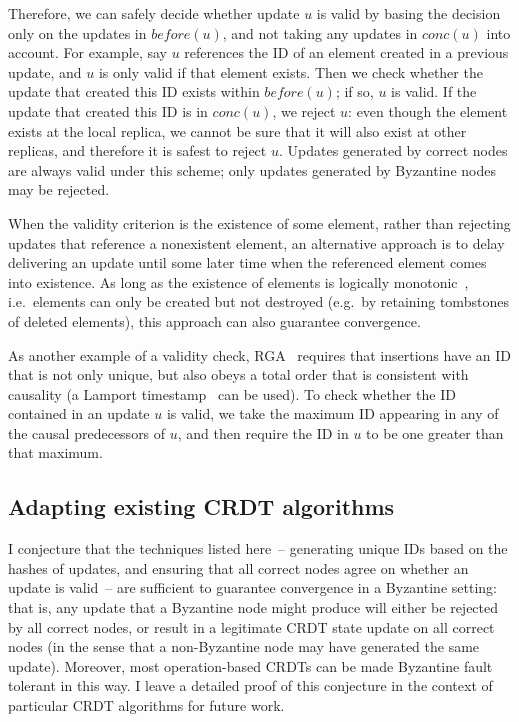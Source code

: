 \documentclass[sigplan,review]{acmart}
\begin{document}
Therefore, we can safely decide whether update $u$ is valid by basing the decision only on the updates in $\mathit{before}(u)$, and not taking any updates in $\mathit{conc}(u)$ into account.
For example, say $u$ references the ID of an element created in a previous update, and $u$ is only valid if that element exists.
Then we check whether the update that created this ID exists within $\mathit{before}(u)$; if so, $u$ is valid.
If the update that created this ID is in $\mathit{conc}(u)$, we reject $u$: even though the element exists at the local replica, we cannot be sure that it will also exist at other replicas, and therefore it is safest to reject $u$.
Updates generated by correct nodes are always valid under this scheme; only updates generated by Byzantine nodes may be rejected.

When the validity criterion is the existence of some element, rather than rejecting updates that reference a nonexistent element, an alternative approach is to delay delivering an update until some later time when the referenced element comes into existence.
As long as the existence of elements is logically monotonic~\cite{Alvaro:2011}, i.e.\ elements can only be created but not destroyed (e.g.\ by retaining tombstones of deleted elements), this approach can also guarantee convergence.

As another example of a validity check, RGA~\cite{Roh:2011} requires that insertions have an ID that is not only unique, but also obeys a total order that is consistent with causality (a Lamport timestamp~\cite{Lamport:1978} can be used).
To check whether the ID contained in an update $u$ is valid, we take the maximum ID appearing in any of the causal predecessors of $u$, and then require the ID in $u$ to be one greater than that maximum.

\subsection{Adapting existing CRDT algorithms}

I conjecture that the techniques listed here~-- generating unique IDs based on the hashes of updates, and ensuring that all correct nodes agree on whether an update is valid~-- are sufficient to guarantee convergence in a Byzantine setting: that is, any update that a Byzantine node might produce will either be rejected by all correct nodes, or result in a legitimate CRDT state update on all correct nodes (in the sense that a non-Byzantine node may have generated the same update).
Moreover, most operation-based CRDTs can be made Byzantine fault tolerant in this way.
I leave a detailed proof of this conjecture in the context of particular CRDT algorithms for future work.
\end{document}
